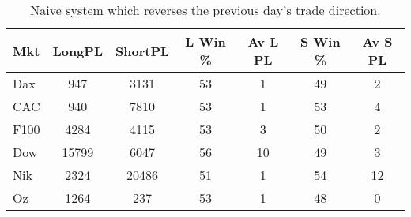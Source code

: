 \begin{table}[ht]
\centering
\caption[Naive Following System.]{Naive system which reverses the previous day's trade direction.} 
\label{tab:ntfresults}
\begin{tabular}{lcccccc}
  \toprule Mkt & LongPL & ShortPL & L Win \% & Av L PL & S Win \% & Av S PL \\ 
  \midrule Dax & 947 & 3131 & 53 & 1 & 49 & 2 \\ 
  CAC & 940 & 7810 & 53 & 1 & 53 & 4 \\ 
  F100 & 4284 & 4115 & 53 & 3 & 50 & 2 \\ 
  Dow & 15799 & 6047 & 56 & 10 & 49 & 3 \\ 
  Nik & 2324 & 20486 & 51 & 1 & 54 & 12 \\ 
  Oz & 1264 & 237 & 53 & 1 & 48 & 0 \\ 
   \bottomrule \end{tabular}
\end{table}
